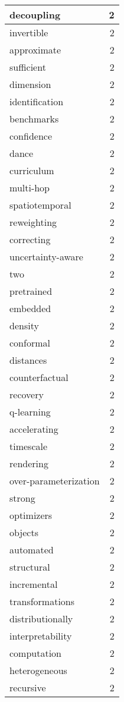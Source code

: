 \begin{table}[h]
\begin{tabular}{|l|r|}
\hline
decoupling & 2 \\
\hline
invertible & 2 \\
\hline
approximate & 2 \\
\hline
sufficient & 2 \\
\hline
dimension & 2 \\
\hline
identification & 2 \\
\hline
benchmarks & 2 \\
\hline
confidence & 2 \\
\hline
dance & 2 \\
\hline
curriculum & 2 \\
\hline
multi-hop & 2 \\
\hline
spatiotemporal & 2 \\
\hline
reweighting & 2 \\
\hline
correcting & 2 \\
\hline
uncertainty-aware & 2 \\
\hline
two & 2 \\
\hline
pretrained & 2 \\
\hline
embedded & 2 \\
\hline
density & 2 \\
\hline
conformal & 2 \\
\hline
distances & 2 \\
\hline
counterfactual & 2 \\
\hline
recovery & 2 \\
\hline
q-learning & 2 \\
\hline
accelerating & 2 \\
\hline
timescale & 2 \\
\hline
rendering & 2 \\
\hline
over-parameterization & 2 \\
\hline
strong & 2 \\
\hline
optimizers & 2 \\
\hline
objects & 2 \\
\hline
automated & 2 \\
\hline
structural & 2 \\
\hline
incremental & 2 \\
\hline
transformations & 2 \\
\hline
distributionally & 2 \\
\hline
interpretability & 2 \\
\hline
computation & 2 \\
\hline
heterogeneous & 2 \\
\hline
recursive & 2 \\

\end{tabular}
\end{table}

